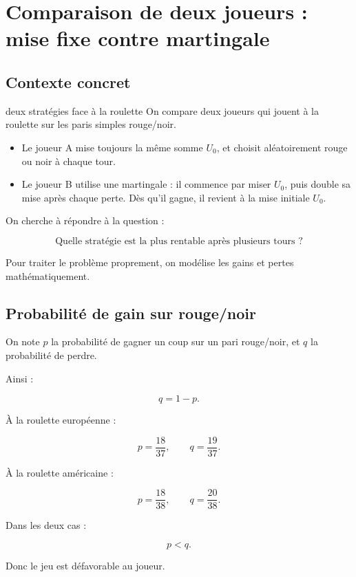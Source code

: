 \documentclass[11pt,a4paper]{article}
\begin{document}
\section{Comparaison de deux joueurs : mise fixe contre martingale}

\subsection{Contexte concret}

\begin{contexte}{deux stratégies face à la roulette}
On compare deux joueurs qui jouent à la roulette sur les paris simples rouge/noir.

\begin{itemize}
    \item Le joueur A mise toujours la même somme \(U_0\), et choisit aléatoirement rouge ou noir à chaque tour.
    \item Le joueur B utilise une martingale : il commence par miser \(U_0\), puis double sa mise après chaque perte. Dès qu'il gagne, il revient à la mise initiale \(U_0\).
\end{itemize}

On cherche à répondre à la question :

\[
\text{Quelle stratégie est la plus rentable après plusieurs tours ?}
\]

Pour traiter le problème proprement, on modélise les gains et pertes mathématiquement.
\end{contexte}

\subsection{Probabilité de gain sur rouge/noir}

On note \(p\) la probabilité de gagner un coup sur un pari rouge/noir, et \(q\) la probabilité de perdre.

Ainsi :

\[
q=1-p.
\]

À la roulette européenne :

\[
p=\frac{18}{37},
\qquad
q=\frac{19}{37}.
\]

À la roulette américaine :

\[
p=\frac{18}{38},
\qquad
q=\frac{20}{38}.
\]

Dans les deux cas :

\[
p<q.
\]

Donc le jeu est défavorable au joueur.
\end{document}
